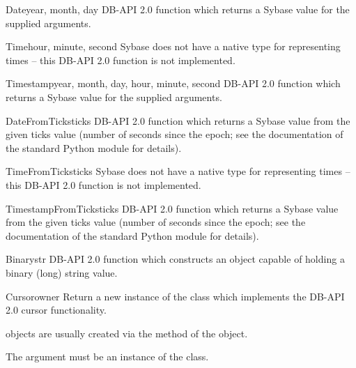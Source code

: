 \begin{funcdesc}{Date}{year, month, day}
DB-API 2.0 function which returns a Sybase  value for
the supplied arguments.
\end{funcdesc}

\begin{funcdesc}{Time}{hour, minute, second}
Sybase does not have a native type for representing times -- this
DB-API 2.0 function is not implemented.
\end{funcdesc}

\begin{funcdesc}{Timestamp}{year, month, day, hour, minute, second}
DB-API 2.0 function which returns a Sybase  value for
the supplied arguments.
\end{funcdesc}

\begin{funcdesc}{DateFromTicks}{ticks}
DB-API 2.0 function which returns a Sybase  value from
the given ticks value (number of seconds since the epoch; see the
documentation of the standard Python  module for
details).
\end{funcdesc}

\begin{funcdesc}{TimeFromTicks}{ticks}
Sybase does not have a native type for representing times -- this
DB-API 2.0 function is not implemented.
\end{funcdesc}

\begin{funcdesc}{TimestampFromTicks}{ticks}
DB-API 2.0 function which returns a Sybase  value from
the given ticks value (number of seconds since the epoch; see the
documentation of the standard Python  module for
details).
\end{funcdesc}

\begin{funcdesc}{Binary}{str}
DB-API 2.0 function which constructs an object capable of holding a
binary (long) string value.
\end{funcdesc}

\begin{classdesc}{Cursor}{owner}
Return a new instance of the  class which implements the
DB-API 2.0 cursor functionality.

 objects are usually created via the
 method of the  object.

The  argument must be an instance of the 
class.
\end{classdesc}

